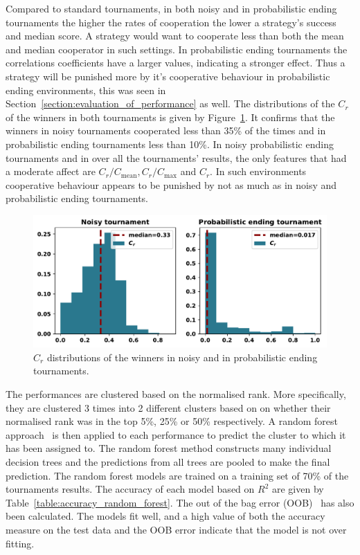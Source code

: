 \documentclass{article}
\begin{document}
Compared to standard tournaments, in both noisy and in probabilistic ending
tournaments the higher the rates of cooperation the lower a strategy's success
and median score. A strategy would want to cooperate less than both
the mean and median cooperator in such settings. In probabilistic ending
tournaments the correlations coefficients have a larger values, indicating a
stronger effect. Thus a strategy will be punished more by it's cooperative
behaviour in probabilistic ending environments, this was seen in Section~\ref{section:evaluation_of_performance}
as well. The distributions of the $C_r$ of the winners in
both tournaments is given by Figure~\ref{fig:c_r_distributions}. It confirms
that the winners in noisy tournaments cooperated less than 35\% of the times
and in probabilistic ending tournaments less than 10\%.
In noisy probabilistic ending tournaments and in over all the tournaments' results,
the only features that had a moderate affect are $C_r/C_{\text{mean}},
C_r/C_{\text{max}}$ and $C_r$. In such environments cooperative behaviour
appears to be punished by not as much as in noisy and probabilistic ending
tournaments.

\begin{figure}[!htbp]
    \centering
    \includegraphics[width=.65\textwidth]{../images/c_r_winners_tournaments.pdf}
    \caption{$C_r$ distributions of the winners in noisy and in probabilistic
    ending tournaments.}\label{fig:c_r_distributions}
\end{figure}

The performances are clustered based on the normalised rank. More specifically,
they are clustered 3 times into 2 different clusters based on  on whether their
normalised rank was in the top 5\%, 25\% or 50\% respectively. A random forest
approach~\cite{breiman2001} is then applied to each performance to predict the cluster to
which it has been assigned to. The random forest method
constructs many individual decision trees and the predictions from all trees are
pooled to make the final prediction. The random forest models are trained on a
training set of 70\% of the tournaments results. The accuracy of each model
based on $R^2$ are given by Table~\ref{table:accuracy_random_forest}. The out of
the bag error (OOB)~\cite{hastie2005} has also been calculated. The models fit well,
and a high value of both the accuracy measure on the test data and the OOB error
indicate that the model is not over fitting.
\end{document}
